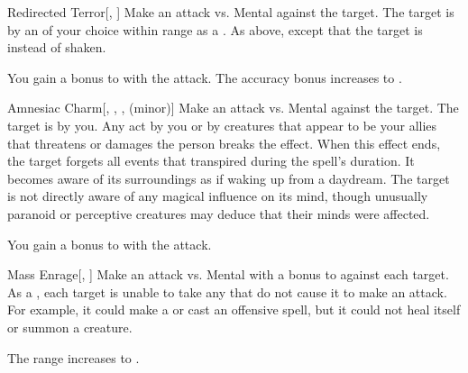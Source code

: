 \lowercase{\hypertarget{spell:Redirected Terror}{}}\label{spell:Redirected Terror}
\begin{freeability}[Rank 3]{\hypertarget{spell:Redirected Terror}{Redirected Terror}}[, ]
Make an attack vs. Mental against the target.
\hit The target is \shaken by an  of your choice within range as a .
\crit As above, except that the target is \panicked instead of shaken.

\rankline
{} You gain a  bonus to  with the attack.
 The accuracy bonus increases to .
\end{freeability}
\vspace{0.25em}



\lowercase{\hypertarget{spell:Amnesiac Charm}{}}\label{spell:Amnesiac Charm}
\begin{freeability}[Rank 6]{\hypertarget{spell:Amnesiac Charm}{Amnesiac Charm}}[, , ,  (minor)]
Make an attack vs. Mental against the target.
\hit The target is \charmed by you.
Any act by you or by creatures that appear to be your allies that threatens or damages the  person breaks the effect.
When this effect ends, the target forgets all events that transpired during the spell's duration.
It becomes aware of its surroundings as if waking up from a daydream.
The target is not directly aware of any magical influence on its mind, though unusually paranoid or perceptive creatures may deduce that their minds were affected.

\rankline
{} You gain a  bonus to  with the attack.
\end{freeability}
\vspace{0.25em}



\lowercase{\hypertarget{spell:Mass Enrage}{}}\label{spell:Mass Enrage}
\begin{freeability}[Rank 6]{\hypertarget{spell:Mass Enrage}{Mass Enrage}}[, ]
Make an attack vs. Mental with a  bonus to  against each target.
\hit As a , each target is unable to take any  that do not cause it to make an attack.
For example, it could make a  or cast an offensive spell, but it could not heal itself or summon a creature.

\rankline
{} The range increases to \rnglong.
\end{freeability}
\vspace{0.25em}




